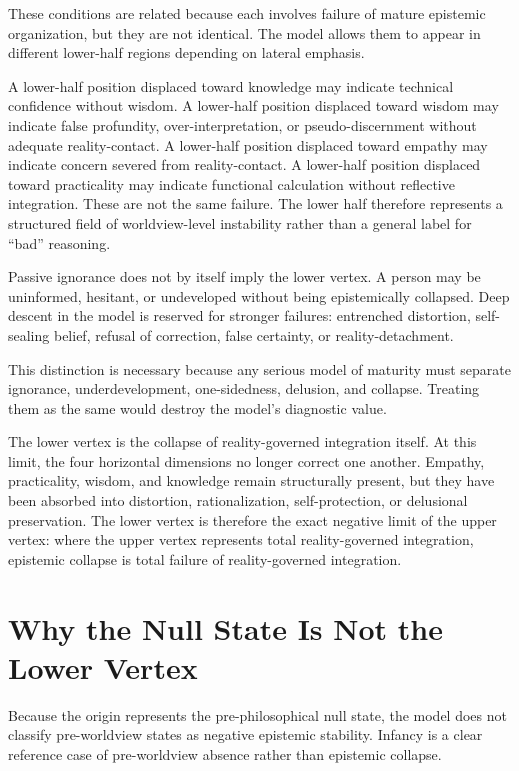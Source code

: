 \documentclass[11pt]{article}
\begin{document}
These conditions are related because each involves failure of mature epistemic organization, but they are not identical. The model allows them to appear in different lower-half regions depending on lateral emphasis.

A lower-half position displaced toward knowledge may indicate technical confidence without wisdom. A lower-half position displaced toward wisdom may indicate false profundity, over-interpretation, or pseudo-discernment without adequate reality-contact. A lower-half position displaced toward empathy may indicate concern severed from reality-contact. A lower-half position displaced toward practicality may indicate functional calculation without reflective integration. These are not the same failure. The lower half therefore represents a structured field of worldview-level instability rather than a general label for ``bad'' reasoning.

Passive ignorance does not by itself imply the lower vertex. A person may be uninformed, hesitant, or undeveloped without being epistemically collapsed. Deep descent in the model is reserved for stronger failures: entrenched distortion, self-sealing belief, refusal of correction, false certainty, or reality-detachment.

This distinction is necessary because any serious model of maturity must separate ignorance, underdevelopment, one-sidedness, delusion, and collapse. Treating them as the same would destroy the model's diagnostic value.

The lower vertex is the collapse of reality-governed integration itself. At this limit, the four horizontal dimensions no longer correct one another. Empathy, practicality, wisdom, and knowledge remain structurally present, but they have been absorbed into distortion, rationalization, self-protection, or delusional preservation. The lower vertex is therefore the exact negative limit of the upper vertex: where the upper vertex represents total reality-governed integration, epistemic collapse is total failure of reality-governed integration.

\section{Why the Null State Is Not the Lower Vertex}

Because the origin represents the pre-philosophical null state, the model does not classify pre-worldview states as negative epistemic stability. Infancy is a clear reference case of pre-worldview absence rather than epistemic collapse.
\end{document}
